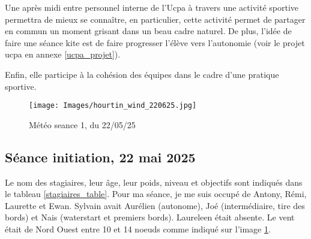 \documentclass[11pt,a4paper]{report}
\begin{document}
Une après midi entre personnel interne de l'Ucpa à travers une 
activité sportive permettra  de mieux se connaître, 
en particulier, cette activité permet de partager en commun
un moment grisant dans un beau cadre naturel. De plus, l'idée
de faire une séance kite est de faire progresser l'élève vers 
l'autonomie (voir le projet ucpa en annexe \ref{ucpa_projet}).

Enfin, elle participe à la cohésion des équipes
dans le cadre d'une pratique sportive.

\begin{figure}
\centering
\texttt{[image: Images/hourtin\_wind\_220625.jpg]} 
\caption{Météo seance 1, du 22/05/25\label{meteo}}
\end{figure}

\subsection{Séance initiation, 22 mai 2025}

Le nom des stagiaires, leur \^age, leur poids, niveau et objectifs sont
indiqués dans le tableau \ref{stagiaires_table}.
Pour ma séance, je me suis occupé de Antony, Rémi, Laurette et Ewan.
Sylvain avait Aurélien (autonome), Joé (intermédiaire, tire des bords)
et Nais (waterstart et premiers bords).
Laureleen était absente. Le vent était de Nord Ouest entre 
10 et 14 noeuds comme indiqué sur l'image \ref{meteo}.
\end{document}

